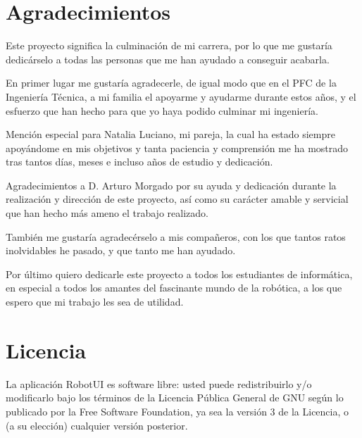 

\section{Agradecimientos}
\label{sec:agradecimientos}

Este proyecto significa la culminación de mi carrera, por lo que me gustaría dedicárselo a todas las personas que me han ayudado a conseguir acabarla.\bigskip

En primer lugar me gustaría agradecerle, de igual modo que en el PFC de la Ingeniería Técnica, a mi familia el apoyarme y ayudarme durante estos años,
y el esfuerzo que han hecho para que yo haya podido culminar mi ingeniería.\bigskip

Mención especial para Natalia Luciano, mi pareja, la cual ha estado siempre apoyándome en mis objetivos y tanta paciencia y comprensión me ha mostrado tras tantos días, meses e incluso años de estudio 
y dedicación.\bigskip

Agradecimientos a D. Arturo Morgado por su ayuda y dedicación durante la realización y dirección de este proyecto, así como su carácter amable y servicial que han hecho más ameno el trabajo realizado.\bigskip

También me gustaría agradecérselo a mis compañeros, con los que tantos ratos inolvidables he pasado, y que tanto me han ayudado.\bigskip

Por último quiero dedicarle este proyecto a todos los estudiantes de informática, en especial a todos los amantes del fascinante mundo de la robótica, a los que espero que mi trabajo les sea de utilidad.

\cleardoublepage

\section{Licencia}
\label{sec:licencia}

\bigskip
\bigskip

La aplicación RobotUI es software libre: usted puede redistribuirlo y/o modificarlo bajo los términos de la Licencia Pública General de GNU según lo publicado por la Free Software Foundation, ya sea la versión 3 
de la Licencia, o (a su elección) cualquier versión posterior.\\


